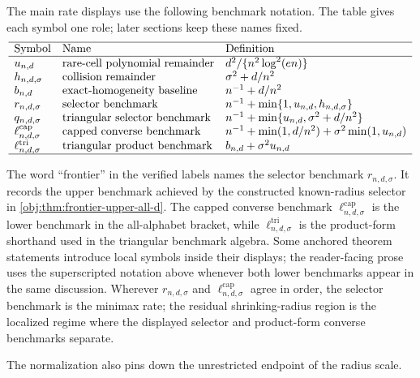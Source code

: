 The main rate displays use the following benchmark notation. The table gives each symbol one role; later sections keep these names fixed.
\[
\begin{array}{lll}
\hline
\text{Symbol} & \text{Name} & \text{Definition}\\
\hline
u_{n,d} & \text{rare-cell polynomial remainder} & d^2/\{n^2\log^2(en)\}\\
h_{n,d,\sigma} & \text{collision remainder} & \sigma^2+d/n^2\\
b_{n,d} & \text{exact-homogeneity baseline} & n^{-1}+d/n^2\\
r_{n,d,\sigma} & \text{selector benchmark} & n^{-1}+\min\{1,u_{n,d},h_{n,d,\sigma}\}\\
q_{n,d,\sigma} & \text{triangular selector benchmark} & n^{-1}+\min\{u_{n,d},\sigma^2+d/n^2\}\\
\ell^{\mathrm{cap}}_{n,d,\sigma} & \text{capped converse benchmark} & n^{-1}+\min(1,d/n^2)+\sigma^2\min(1,u_{n,d})\\
\ell^{\mathrm{tri}}_{n,d,\sigma} & \text{triangular product benchmark} & b_{n,d}+\sigma^2u_{n,d}\\
\hline
\end{array}
\]

The word ``frontier'' in the verified labels names the selector benchmark \(r_{n,d,\sigma}\). It records the upper benchmark achieved by the constructed known-radius selector in \cref{obj:thm:frontier-upper-all-d}. The capped converse benchmark \(\ell^{\mathrm{cap}}_{n,d,\sigma}\) is the lower benchmark in the all-alphabet bracket, while \(\ell^{\mathrm{tri}}_{n,d,\sigma}\) is the product-form shorthand used in the triangular benchmark algebra. Some anchored theorem statements introduce local symbols inside their displays; the reader-facing prose uses the superscripted notation above whenever both lower benchmarks appear in the same discussion. Wherever \(r_{n,d,\sigma}\) and \(\ell^{\mathrm{cap}}_{n,d,\sigma}\) agree in order, the selector benchmark is the minimax rate; the residual shrinking-radius region is the localized regime where the displayed selector and product-form converse benchmarks separate.

The normalization also pins down the unrestricted endpoint of the radius scale.

